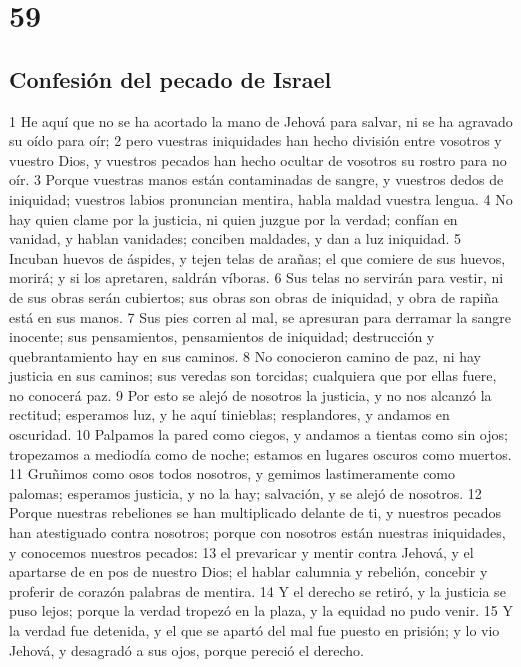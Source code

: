 \chapter{59}

\section*{Confesión del pecado de Israel}

1 He aquí que no se ha acortado la mano de Jehová para salvar, ni se ha agravado su oído para oír;
2 pero vuestras iniquidades han hecho división entre vosotros y vuestro Dios, y vuestros pecados han hecho ocultar de vosotros su rostro para no oír.
3 Porque vuestras manos están contaminadas de sangre, y vuestros dedos de iniquidad; vuestros labios pronuncian mentira, habla maldad vuestra lengua.
4 No hay quien clame por la justicia, ni quien juzgue por la verdad; confían en vanidad, y hablan vanidades; conciben maldades, y dan a luz iniquidad.
5 Incuban huevos de áspides, y tejen telas de arañas; el que comiere de sus huevos, morirá; y si los apretaren, saldrán víboras.
6 Sus telas no servirán para vestir, ni de sus obras serán cubiertos; sus obras son obras de iniquidad, y obra de rapiña está en sus manos.
7 Sus pies corren al mal, se apresuran para derramar la sangre inocente; sus pensamientos, pensamientos de iniquidad; destrucción y quebrantamiento hay en sus caminos.
8 No conocieron camino de paz, ni hay justicia en sus caminos; sus veredas son torcidas; cualquiera que por ellas fuere, no conocerá paz.
9 Por esto se alejó de nosotros la justicia, y no nos alcanzó la rectitud; esperamos luz, y he aquí tinieblas; resplandores, y andamos en oscuridad.
10 Palpamos la pared como ciegos, y andamos a tientas como sin ojos; tropezamos a mediodía como de noche; estamos en lugares oscuros como muertos.
11 Gruñimos como osos todos nosotros, y gemimos lastimeramente como palomas; esperamos justicia, y no la hay; salvación, y se alejó de nosotros.
12 Porque nuestras rebeliones se han multiplicado delante de ti, y nuestros pecados han atestiguado contra nosotros; porque con nosotros están nuestras iniquidades, y conocemos nuestros pecados:
13 el prevaricar y mentir contra Jehová, y el apartarse de en pos de nuestro Dios; el hablar calumnia y rebelión, concebir y proferir de corazón palabras de mentira.
14 Y el derecho se retiró, y la justicia se puso lejos; porque la verdad tropezó en la plaza, y la equidad no pudo venir.
15 Y la verdad fue detenida, y el que se apartó del mal fue puesto en prisión; y lo vio Jehová, y desagradó a sus ojos, porque pereció el derecho.
